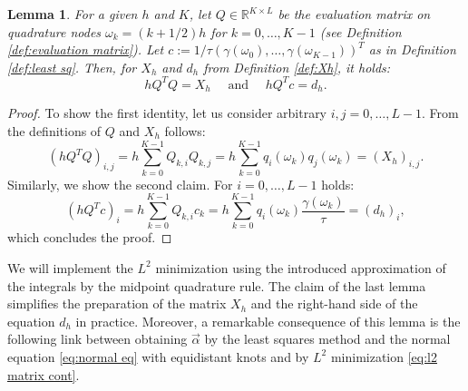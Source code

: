 \documentclass[a4paper,11pt,bibliography=totoc,listof=totoc,headinclude=true,cleardoublepage=empty,oneside]{scrbook}
\newtheorem{lemma}[theorem]{Lemma}
\newcommand{\R}{\mathbb{R}}
\begin{document}
    
\begin{lemma}\label{lemma:QTQ}
    For a given $h$ and $K$, let $Q \in \R^{K\times L}$ be the evaluation matrix on quadrature nodes $\omega_k = (k+1/2)h$ for $k = 0, \dots, K-1$ (see Definition \ref{def:evaluation matrix}). Let $c := 1/\tau \left(\gamma(\omega_0), \dots, \gamma(\omega_{K-1})\right)^T$ as in Definition \ref{def:least sq}.
    Then, for $X_h$ and $d_h$ from Definition \ref{def:Xh}, it holds: 
    \begin{equation*}\label{eq:link QTQ=X}
        h Q^T Q = X_h \quad \text{ and } \quad h Q^Tc = d_h.
    \end{equation*}
\end{lemma}
\begin{proof}
    To show the first identity, let us consider arbitrary $i, j = 0, \dots, L-1$. From the definitions of $Q$ and $X_h$ follows:
    \begin{equation*}
        \left(hQ^TQ\right)_{i,j} =  h \sum_{k=0}^{K-1} Q_{k,i} Q_{k,j} = h \sum_{k=0}^{K-1} q_i(\omega_k)q_j(\omega_k) = (X_h)_{i,j}.
    \end{equation*}
    Similarly, we show the second claim. For $i = 0, \dots, L-1$ holds:
    \begin{equation*}
        \left(hQ^T c\right)_i = h \sum_{k=0}^{K-1} Q_{k,i}c_k = h\sum_{k=0}^{K-1} q_i(\omega_k) \frac{\gamma(\omega_k)}{\tau} = \left(d_h\right)_i,
    \end{equation*}
    which concludes the proof.
\end{proof}

We will implement the $L^2$ minimization using the introduced approximation of the integrals by the midpoint quadrature rule. The claim of the last lemma simplifies the preparation of the matrix $X_h$ and the right-hand side of the equation $d_h$ in practice. Moreover, a remarkable consequence of this lemma is the following link between obtaining $\Vec{\alpha}$ by the least squares method and the normal equation \eqref{eq:normal eq} with equidistant knots and by $L^2$ minimization \eqref{eq:l2 matrix cont}.
\end{document}

